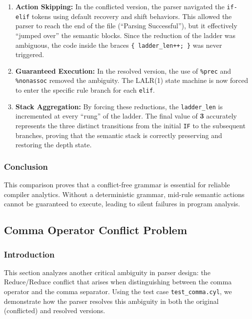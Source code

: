 \documentclass[a4paper,12pt]{article}
\begin{document}
\begin{enumerate}
    \item \textbf{Action Skipping:} In the conflicted version, the parser navigated the \texttt{if-elif} tokens using default recovery and shift behaviors. This allowed the parser to reach the end of the file (``Parsing Successful''), but it effectively ``jumped over'' the semantic blocks. Since the reduction of the ladder was ambiguous, the code inside the braces \texttt{\{ ladder\_len++; \}} was never triggered.

    \item \textbf{Guaranteed Execution:} In the resolved version, the use of \texttt{\%prec} and \texttt{\%nonassoc} removed the ambiguity. The LALR(1) state machine is now forced to enter the specific rule branch for each \texttt{elif}.

    \item \textbf{Stack Aggregation:} By forcing these reductions, the \texttt{ladder\_len} is incremented at every ``rung'' of the ladder. The final value of \textbf{3} accurately represents the three distinct transitions from the initial \texttt{IF} to the subsequent branches, proving that the semantic stack is correctly preserving and restoring the depth state.
\end{enumerate}

\subsubsection{Conclusion}

This comparison proves that a conflict-free grammar is essential for reliable compiler analytics. Without a deterministic grammar, mid-rule semantic actions cannot be guaranteed to execute, leading to silent failures in program analysis.

\newpage

\subsection{Comma Operator Conflict Problem}
\label{sec:comma_operator_analysis}

\subsubsection{Introduction}

This section analyzes another critical ambiguity in parser design: the Reduce/Reduce conflict that arises when distinguishing between the comma operator and the comma separator. Using the test case \texttt{test\_comma.cyl}, we demonstrate how the parser resolves this ambiguity in both the original (conflicted) and resolved versions.
\end{document}

